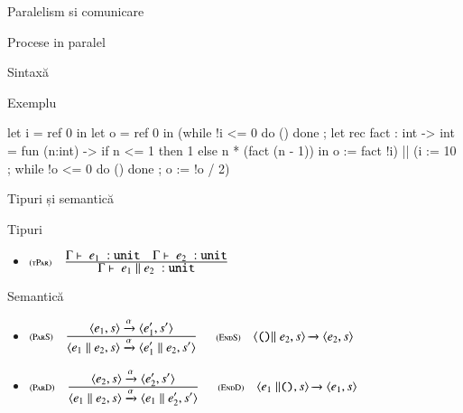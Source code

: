 \documentclass[xcolor=pdftex,romanian,colorlinks]{beamer}
\begin{document}
\begin{section}{Paralelism si comunicare}
\begin{frame}[fragile]{Procese in paralel}
\begin{block}{Sintaxă}
\begin{syntaxBlock}{\Exp}
\vspace{-5ex}
\alert{
\begin{itemize}
\item[]\renewcommand{\syntaxKeyword}{}
\syntax{\ldots}{}
\syntaxCont{\Exp \Spar \Exp}{}
	\end{itemize}
}
\end{syntaxBlock}
\end{block}

\begin{block}{Exemplu}
\begin{asciiml}
let i = ref 0 in
let o = ref 0 in 
  (while !i <= 0 do () done ;
   let rec fact  : int -> int = 
           fun (n:int) -> if n <= 1 then 1 else n * (fact (n - 1))
   in o := fact !i)
  ||
  (i := 10 ;
   while !o <= 0 do () done ; 
   o := !o / 2)
\end{asciiml}
\end{block}
\end{frame}

\begin{frame}{Tipuri și semantică}
\begin{block}{Tipuri}
\begin{itemize}
\item[]$\reg[tPar]{\tjud{e_1\Spar e_2}{\Sunit}{}}{\tjud{e_1}{\Sunit}{} \si \tjud{e_2}{\Sunit}{}}{}$
\end{itemize}
\end{block}
\vfill
\begin{block}{Semantică}
\begin{itemize}
\item[] $\reg[ParS]{\Ss[\alpha]{\c{e_1\Spar e_2,s}}{\c{e_1'\Spar e_2,s'}}}{\Ss[\alpha]{\c{e_1,s}}{\c{e_1',s'}}}{}$
\hfill
$\reg[EndS]{\Ss{\c{\Sskip\Spar e_2,s}}{\c{e_2,s}}}{}{}$

\item[]
$\reg[ParD]{\Ss[\alpha]{\c{e_1\Spar e_2,s}}{\c{e_1\Spar e_2',s'}}}{\Ss[\alpha]{\c{e_2,s}}{\c{e_2',s'}}}{}$
\hfill
$\reg[EndD]{\Ss{\c{e_1\Spar\Sskip,s}}{\c{e_1,s}}}{}{}$
\end{itemize}
\end{block}
\end{frame}


\end{section}
\end{document}
